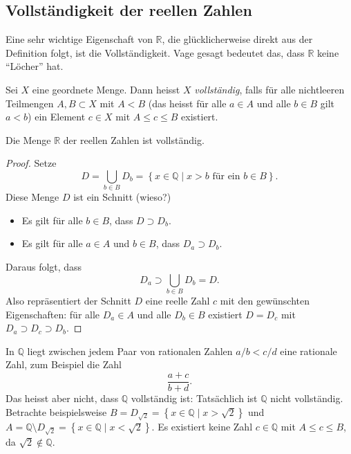 \documentclass[../main.tex]{subfiles}
\begin{document}
\subsection*{Vollständigkeit der reellen Zahlen}
Eine sehr wichtige Eigenschaft von $\mathbb{R}$, die
glücklicherweise direkt aus der Definition folgt,
ist die Vollständigkeit. Vage gesagt bedeutet das,
dass $\mathbb{R}$ keine ``Löcher'' hat.

\begin{definition}
	Sei $X$ 
	eine geordnete Menge. Dann heisst $X$ \emph{vollständig},
	falls für alle nichtleeren Teilmengen $A, B \subset X$
	mit $A < B$ (das heisst für alle $a \in A$ und alle $b \in B$
	gilt $a < b$) ein Element $c \in X$ mit $A \leq c \leq B$
	existiert.
\end{definition}

\begin{claim}
	Die Menge $\mathbb{R}$ der reellen Zahlen ist vollständig.
\end{claim}

\begin{proof}
  Setze
  \[
    D = \bigcup_{b \in B} D_b = \left\{x \in \mathbb{Q} \mid x > b
    \text{ für ein } b \in B \right\}.
  \]
  Diese Menge $D$ ist ein Schnitt (wieso?) %
  \begin{itemize}
	  \item Es gilt für alle $b \in B$, dass $D \supset D_b$.
	  \item Es gilt für alle $a \in A$ und $b \in B$, dass
		  $D_a \supset D_b$.
  \end{itemize}
  Daraus folgt, dass 
	\[
	   D_a 
	   \supset 
	   \bigcup_{b \in B} D_b = D.
	\]
  Also repräsentiert der Schnitt $D$ eine reelle Zahl $c$
  mit den gewünschten Eigenschaften: für alle
  $D_a \in A$ und alle $D_b \in B$ existiert $D = D_c$
  mit $D_a \supset D_c \supset D_b$.
\end{proof}

\begin{remark}
  In $\mathbb Q$ liegt zwischen jedem Paar von rationalen Zahlen
  $a/b < c/d$ eine rationale Zahl, zum Beispiel die Zahl
  \[
    \frac{a+c}{b+d}.
  \]
  Das heisst aber nicht, dass $\mathbb Q$ vollständig ist:
  Tatsächlich ist $\mathbb{Q}$ nicht vollständig. Betrachte
  beispielsweise 
  $B= D_{\sqrt 2} = \left\{x \in \mathbb{Q} \mid x > \sqrt 2 \right\}$
  und $A = \mathbb{Q} \setminus D_{\sqrt 2}
  = \left\{x \in \mathbb{Q} \mid x < \sqrt 2\right\}$.
  Es existiert keine Zahl $c \in \mathbb{Q}$ mit $A \leq c \leq B$,
  da $\sqrt 2 \notin \mathbb{Q}$.
\end{remark}
\end{document}
